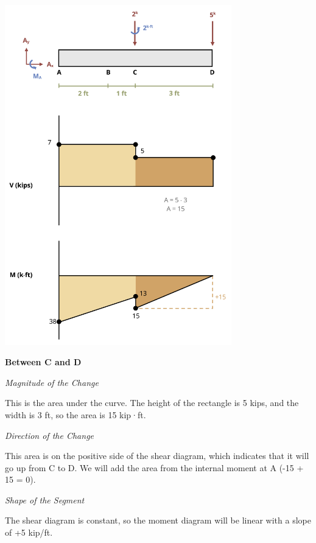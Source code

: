 \documentclass[
  letterpaper,
  DIV=11,
  numbers=noendperiod]{scrreprt}
\begin{document}
\begin{tcolorbox}
\begin{tcolorbox}
\begin{center}
\includegraphics[width=3.875in,height=\textheight]{images/CH7 PNGs/example 7.4 part 6.png}
\end{center}

\textbf{Between C and D}

\emph{Magnitude of the Change}

This is the area under the curve. The height of the rectangle is 5 kips,
and the width is 3 ft, so the area is 15 kip·ft.

\emph{Direction of the Change}

This area is on the positive side of the shear diagram, which indicates
that it will go up from C to D. We will add the area from the internal
moment at A (-15 + 15 = 0).

\emph{Shape of the Segment}

The shear diagram is constant, so the moment diagram will be linear with
a slope of +5 kip/ft.


\end{tcolorbox}
\end{tcolorbox}
\end{document}
